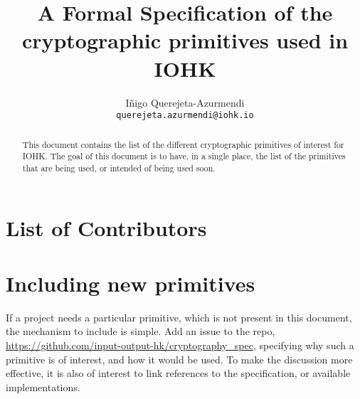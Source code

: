 \cleardoublepage%
  \tableofcontents%

  \listoffigures%
  \clearpage%
\title{A Formal Specification of the cryptographic primitives used in IOHK}

\author{I\~{n}igo Querejeta-Azurmendi  \\ {\small \texttt{querejeta.azurmendi@iohk.io}}}


\maketitle

\begin{abstract}
This document contains the list of the different cryptographic primitives of interest for IOHK. The 
goal of this document is to have, in a single place, the list of the primitives that are being used, 
or intended of being used soon. 
\end{abstract}

\section*{List of Contributors}

\section*{Including new primitives}
If a project needs a particular primitive, which is not present in this document, the mechanism 
to include is simple. Add an issue to the repo, 
\url{https://github.com/input-output-hk/cryptography_spec}, specifying why such a 
primitive is of interest, and how it would be used. To make the discussion more effective, 
it is also of interest to link references to the specification, or available implementations. 
\label{acknowledgements}

